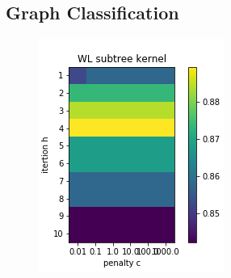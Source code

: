 \documentclass{llncs}
\begin{document}
\subsection{Graph Classification}

\begin{figure}[!htb]
  \includegraphics[width=\linewidth]{gk_sub}
  \label{fig:awesome_image1}
\endminipage\hfill
{}

\end{figure}
\end{document}
